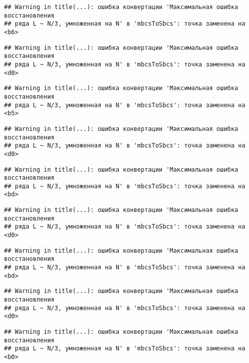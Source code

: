 \documentclass[
]{article}
\begin{document}
\begin{verbatim}
## Warning in title(...): ошибка конвертации 'Максимальная ошибка восстановления
## ряда L ~ N/3, умноженная на N' в 'mbcsToSbcs': точка заменена на <b6>
\end{verbatim}

\begin{verbatim}
## Warning in title(...): ошибка конвертации 'Максимальная ошибка восстановления
## ряда L ~ N/3, умноженная на N' в 'mbcsToSbcs': точка заменена на <d0>
\end{verbatim}

\begin{verbatim}
## Warning in title(...): ошибка конвертации 'Максимальная ошибка восстановления
## ряда L ~ N/3, умноженная на N' в 'mbcsToSbcs': точка заменена на <b5>
\end{verbatim}

\begin{verbatim}
## Warning in title(...): ошибка конвертации 'Максимальная ошибка восстановления
## ряда L ~ N/3, умноженная на N' в 'mbcsToSbcs': точка заменена на <d0>
\end{verbatim}

\begin{verbatim}
## Warning in title(...): ошибка конвертации 'Максимальная ошибка восстановления
## ряда L ~ N/3, умноженная на N' в 'mbcsToSbcs': точка заменена на <bd>
\end{verbatim}

\begin{verbatim}
## Warning in title(...): ошибка конвертации 'Максимальная ошибка восстановления
## ряда L ~ N/3, умноженная на N' в 'mbcsToSbcs': точка заменена на <d0>
\end{verbatim}

\begin{verbatim}
## Warning in title(...): ошибка конвертации 'Максимальная ошибка восстановления
## ряда L ~ N/3, умноженная на N' в 'mbcsToSbcs': точка заменена на <bd>
\end{verbatim}

\begin{verbatim}
## Warning in title(...): ошибка конвертации 'Максимальная ошибка восстановления
## ряда L ~ N/3, умноженная на N' в 'mbcsToSbcs': точка заменена на <d0>
\end{verbatim}

\begin{verbatim}
## Warning in title(...): ошибка конвертации 'Максимальная ошибка восстановления
## ряда L ~ N/3, умноженная на N' в 'mbcsToSbcs': точка заменена на <b0>
\end{verbatim}
\end{document}
